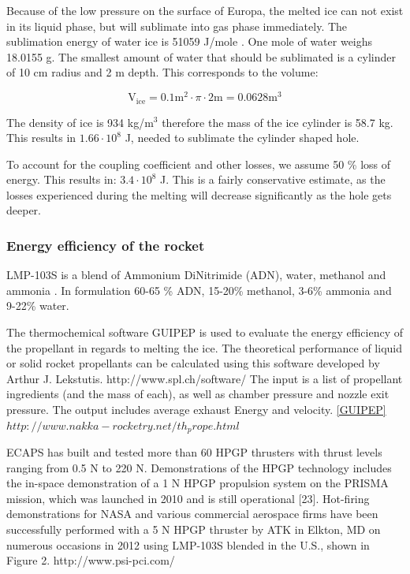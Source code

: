 Because of the low pressure on the surface of Europa, the melted ice can not exist in its liquid phase, but will sublimate into gas phase immediately. The sublimation energy of water ice is 51059 J/mole \cite{ice_properties}. One mole of water weighs 18.0155 g. The smallest amount of water that should be sublimated is a cylinder of 10 cm radius and 2 m depth. This corresponds to the volume:

\begin{equation}
\mathrm{V_{ice}}=0.1 \mathrm{m}^2 \cdot \pi \cdot 2 \mathrm{m} = 0.0628 \mathrm{m}^3
\end{equation}

The density of ice is 934 kg/m$^3$ therefore the mass of the ice cylinder is 58.7 kg. This results in $1.66\cdot 10^8$ J, needed to sublimate the cylinder shaped hole. 

To account for the coupling coefficient and other losses, we assume 50 \% loss of energy. This results in: $3.4 \cdot 10^8$ J. This is a fairly conservative estimate, as the losses experienced during the melting will decrease significantly as the hole gets deeper. 




\subsubsection{Energy efficiency of the rocket}

LMP-103S is a blend of Ammonium DiNitrimide (ADN), water, methanol and ammonia \cite{Walter_2014}. In formulation 60-65 \% ADN, 15-20\% methanol, 3-6\% ammonia and 9-22\% water. \cite{Taylor_2013}



The thermochemical software GUIPEP is used to evaluate the energy efficiency of the propellant in regards to melting the ice. The theoretical performance of liquid or solid rocket propellants can be calculated using this software developed by Arthur J. Lekstutis. http://www.spl.ch/software/ The input is a list of propellant ingredients (and the mass of each), as well as chamber pressure and nozzle exit pressure. The output includes average exhaust Energy and velocity. \ref{GUIPEP} $http://www.nakka-rocketry.net/th_prope.html$

ECAPS has built and tested more than 60 HPGP thrusters with thrust levels ranging from 0.5 N to 220 N.
Demonstrations of the HPGP technology includes the in-space demonstration of a 1 N HPGP propulsion system on
the PRISMA mission, which was launched in 2010 and is still operational [23]. Hot-firing demonstrations for
NASA and various commercial aerospace firms have been successfully performed with a 5 N HPGP thruster by
ATK in Elkton, MD on numerous occasions in 2012 using LMP-103S blended in the U.S., shown in Figure 2. http://www.psi-pci.com/
